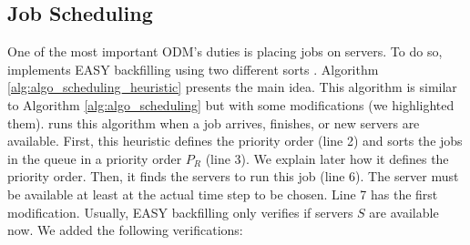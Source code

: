 \subsection{Job Scheduling}
\label{sec:model_easy}

One of the most important ODM's duties is placing jobs on servers. To do so, \emph{\systemName} implements EASY backfilling using two different sorts \cite{mu2001utilization, lelong2018tuning}. Algorithm \ref{alg:algo_scheduling_heuristic} presents the main idea. This algorithm is similar to Algorithm \ref{alg:algo_scheduling} but with some modifications (we highlighted them). \emph{\systemName} runs this algorithm when a job arrives, finishes, or new servers are available. First, this heuristic defines the priority order (line 2) and sorts the jobs in the queue in a priority order $P_{R}$ (line 3). We explain later how it defines the priority order. Then, it finds the servers to run this job (line 6). The server must be available at least at the actual time step to be chosen. Line 7 has the first modification. Usually, EASY backfilling only verifies if servers $S$ are available now. We added the following verifications:


